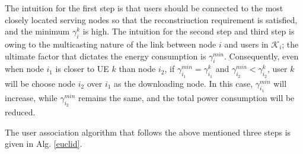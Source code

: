 \documentclass[journal,12pt,onecolumn]{IEEEtran}
\begin{document}
The intuition for the first step is that users should be connected to the most closely located serving nodes so that the reconstriuction requirement is satisfied, and the minimum $\gamma_i^k$ is high. The intuition for the second step and third step is owing to the multicasting nature of the link between node $i$ and users in $\mathcal{K}_i$; the ultimate factor that dictates the energy consumption is $\gamma_i^{min}$. Consequently, even when node $i_1$ is closer to UE $k$ than node $i_2$, if $\gamma_{i_1}^{min}=\gamma_{i_1}^k$ and $\gamma_{i_2}^{min}<\gamma_{i_2}^k$, user $k$ will be choose node $i_2$ over $i_1$ as the downloading node. In this case, $\gamma_{i_1}^{min}$ will increase, while $\gamma_{i_2}^{min}$ remains the same, and the total power consumption will be reduced.

The user association algorithm that follows the above mentioned three steps is given in Alg. \ref{euclid}.
\end{document}
